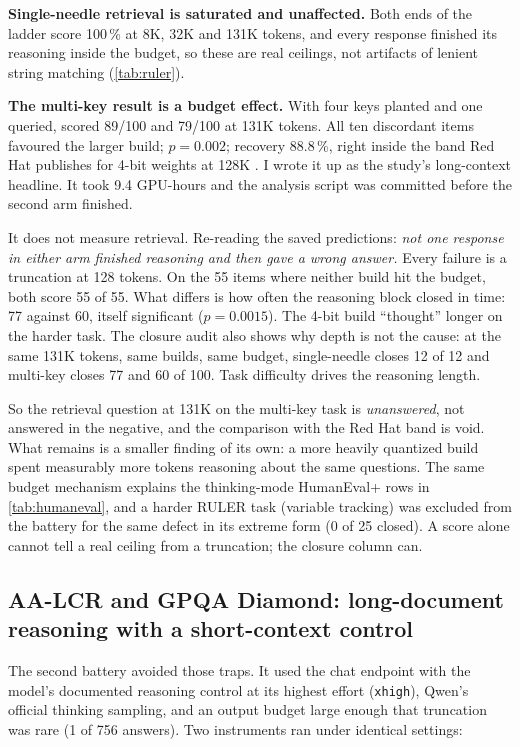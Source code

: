 \textbf{Single-needle retrieval is saturated and unaffected.} Both ends of the ladder score 100\,\% at
8K, 32K and 131K tokens, and every response finished its reasoning inside the budget, so these are
real ceilings, not artifacts of lenient string matching (\cref{tab:ruler}).

\textbf{The multi-key result is a budget effect.} With four keys planted and one queried, \QsixXL{}
scored 89/100 and \Qfour{} 79/100 at 131K tokens. All ten discordant items favoured the larger build;
$p=0.002$; recovery 88.8\,\%, right inside the band Red Hat publishes for 4-bit weights at 128K
\citep{redhat_longcontext_quant}. I wrote it up as the study's long-context headline. It took 9.4 GPU-hours and
the analysis script was committed before the second arm finished.

It does not measure retrieval. Re-reading the saved predictions: \emph{not one response in either arm
finished reasoning and then gave a wrong answer.} Every failure is a truncation at 128 tokens. On the
55 items where neither build hit the budget, both score 55 of 55. What differs is how often the
reasoning block closed in time: 77 against 60, itself significant ($p=0.0015$). The 4-bit build
``thought'' longer on the harder task. The closure audit also shows why depth is not the cause: at the
same 131K tokens, same builds, same budget, single-needle closes 12 of 12 and multi-key closes 77 and
60 of 100. Task difficulty drives the reasoning length.

So the retrieval question at 131K on the multi-key task is \emph{unanswered}, not answered in the
negative, and the comparison with the Red Hat band is void. What remains is a smaller finding of its own:
a more heavily quantized build spent measurably more tokens reasoning about the same questions. The
same budget mechanism explains the thinking-mode HumanEval+ rows in \cref{tab:humaneval}, and a harder
RULER task (variable tracking) was excluded from the battery for the same defect in its extreme form
(0 of 25 closed). A score alone cannot tell a real ceiling from a truncation; the closure column can.

\subsection{AA-LCR and GPQA Diamond: long-document reasoning with a short-context control}\label{sec:aalcr}

The second battery avoided those traps. It used the chat endpoint with the model's documented
reasoning control at its highest effort (\texttt{xhigh}), Qwen's official thinking sampling, and an
output budget large enough that truncation was rare (1 of 756 answers). Two instruments ran under
identical settings:

